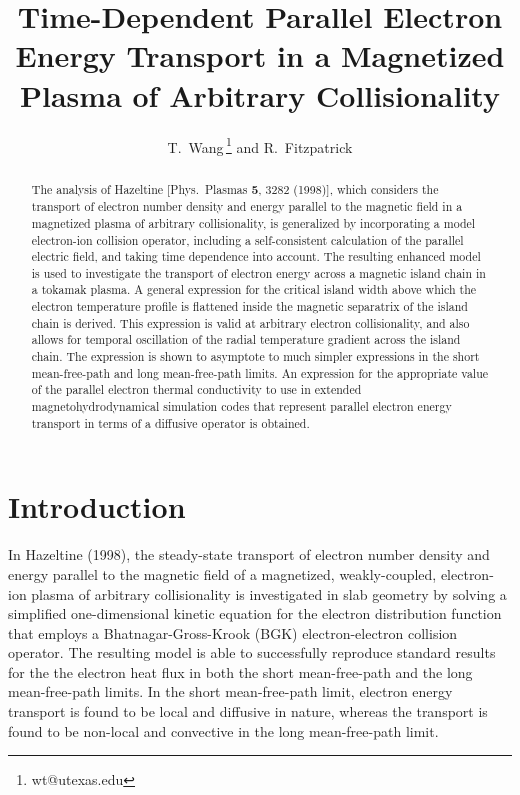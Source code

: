 \documentclass[12pt,prb,aps]{revtex4-1}
\begin{document}
\title{Time-Dependent Parallel Electron Energy Transport in  a Magnetized Plasma of Arbitrary Collisionality}
\author{T.~Wang\,\footnote{wt@utexas.edu} and R.~Fitzpatrick}

\begin{abstract}
The analysis of Hazeltine [Phys.\ Plasmas {\bf 5}, 3282 (1998)], which considers the transport of electron number density and energy parallel to the magnetic
field in a magnetized plasma of arbitrary collisionality,  is generalized by  incorporating a model electron-ion collision operator,
 including a self-consistent calculation of the parallel electric field, and taking time dependence into account. The resulting enhanced model is
 used to investigate the transport of electron energy across a magnetic island chain in a tokamak plasma. A general expression for the critical
 island width above which the electron temperature profile is flattened inside the magnetic separatrix of the island chain is derived.
 This expression is valid at arbitrary electron collisionality, and also allows for temporal oscillation of the radial temperature gradient across the island chain. 
 The expression is shown to asymptote to much  simpler expressions in the short mean-free-path and long mean-free-path limits. An expression for
 the appropriate value of the parallel electron thermal conductivity to use in extended magnetohydrodynamical simulation codes that represent parallel
 electron energy transport in terms of a diffusive operator is obtained. 
 \end{abstract}
\maketitle

\section{Introduction}
In Hazeltine (1998),\cite{haz}  the steady-state transport of electron number density and energy parallel to the magnetic field
of a magnetized, weakly-coupled, electron-ion plasma of arbitrary collisionality is investigated  in slab geometry   by solving a simplified one-dimensional kinetic equation for the electron distribution function that employs a Bhatnagar-Gross-Krook (BGK)  electron-electron collision
operator.\cite{krook}  The resulting model is able to successfully reproduce standard results for the the electron heat flux in both the short mean-free-path and
the long mean-free-path limits. In the short mean-free-path limit, electron energy transport is found to be local and diffusive in nature, whereas the transport is found to be non-local and convective in the
long mean-free-path limit. 
\end{document}
